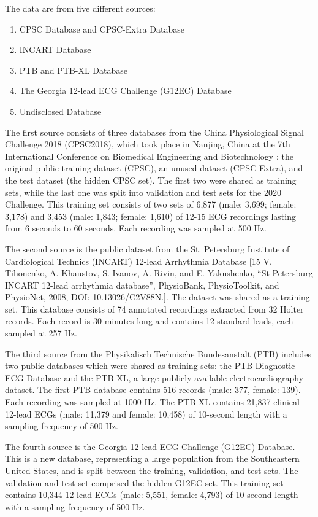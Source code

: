 The data are from five different sources:
\begin{enumerate}
    \item CPSC Database and CPSC-Extra Database
    \item INCART Database
    \item PTB and PTB-XL Database
    \item The Georgia 12-lead ECG Challenge (G12EC) Database 
    \item Undisclosed Database
\end{enumerate}

The first source consists of three databases from the China Physiological Signal Challenge 2018 (CPSC2018), which took place in Nanjing, China at the 7th International Conference on Biomedical Engineering and Biotechnology \cite{dataset2}: the original public training dataset (CPSC), an unused dataset (CPSC-Extra), and the test dataset (the hidden CPSC set). The first two were shared as training sets, while the last one was split into validation and test sets for the 2020 Challenge. This training set consists of two sets of 6,877 (male: 3,699; female: 3,178) and 3,453 (male: 1,843; female: 1,610) of 12-15 ECG recordings lasting from 6 seconds to 60 seconds. Each recording was sampled at 500 Hz.

The second source is the public dataset from the St. Petersburg Institute of Cardiological Technics (INCART) 12-lead Arrhythmia Database [15 V. Tihonenko, A. Khaustov, S. Ivanov, A. Rivin, and E. Yakushenko, “St Petersburg INCART 12-lead arrhythmia database”, PhysioBank, PhysioToolkit, and PhysioNet, 2008, DOI: 10.13026/C2V88N.]. The dataset was shared as a training set. This database consists of 74 annotated recordings extracted from 32 Holter records. Each record is 30 minutes long and contains 12 standard leads, each sampled at 257 Hz.

The third source from the Physikalisch Technische Bundesanstalt (PTB) includes two public databases which were shared as training sets: the PTB Diagnostic ECG Database and the PTB-XL, a large publicly available electrocardiography dataset. The first PTB database contains 516 records (male: 377, female: 139). Each recording was sampled at 1000 Hz. The PTB-XL contains 21,837 clinical 12-lead ECGs (male: 11,379 and female: 10,458) of 10-second length with a sampling frequency of 500 Hz.


The fourth source is the Georgia 12-lead ECG Challenge (G12EC) Database. This is a new database, representing a large population from the Southeastern United States, and is split between the training, validation, and test sets. The validation and test set comprised the hidden G12EC set. This training set contains 10,344 12-lead ECGs (male: 5,551, female: 4,793) of 10-second length with a sampling frequency of 500 Hz.

